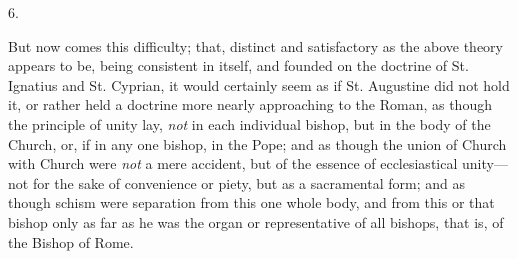 6.

But now comes this difficulty; that, distinct and
satisfactory as the above theory appears to be, being consistent in
itself, and founded on the doctrine of St. Ignatius and St. Cyprian,
it would certainly seem as if St. Augustine did not hold it, or rather
held a doctrine more nearly approaching to the Roman, as though the
principle of unity lay, \emph{not} in each individual bishop, but in
the body of the Church, or, if in any one bishop, in the Pope; and as
though the union of Church with Church were \emph{not} a mere
accident, but of the essence of ecclesiastical unity—not for the
sake of convenience or piety, but as a sacramental form; and as though
schism were separation from this one whole body, and from this or that
bishop only as far as he was the organ or representative of all
bishops, that is, of the Bishop of Rome.

